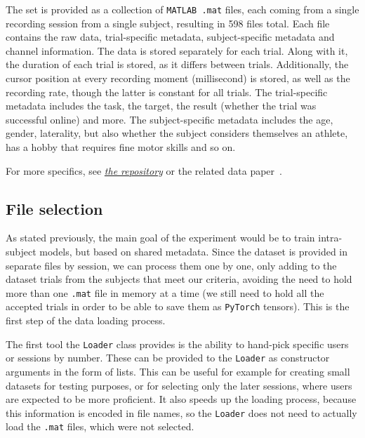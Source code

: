 \documentclass[english, he, bc, kiv, iso690alph]{fasthesis}
\begin{document}
The set is provided as a collection of \texttt{MATLAB .mat} files, each coming from a single recording session from a single subject, resulting in 598 files total. Each file contains the raw data, trial-specific metadata, subject-specific metadata and channel information.
The data is stored separately for each trial. Along with it, the duration of each trial is stored, as it differs between trials. Additionally, the cursor position at every recording moment (millisecond) is stored, as well as the recording rate, though the latter is constant for all trials.
The trial-specific metadata includes the task, the target, the result (whether the trial was successful online) and more.
The subject-specific metadata includes the age, gender, laterality, but also whether the subject considers themselves an athlete, has a hobby that requires fine motor skills and so on.

For more specifics, see \href{https://figshare.com/articles/dataset/Human_EEG_Dataset_for_Brain-Computer_Interface_and_Meditation/13123148?file=25302482}{\textit{the repository}} or the related data paper~\cite{data:stieger:21}.

\subsection{File selection}

As stated previously, the main goal of the experiment would be to train intra-subject models, but based on shared metadata. Since the dataset is provided in separate files by session, we can process them one by one, only adding to the dataset trials from the subjects that meet our criteria, avoiding the need to hold more than one \texttt{.mat} file in memory at a time (we still need to hold all the accepted trials in order to be able to save them as \texttt{PyTorch} tensors). This is the first step of the data loading process.

The first tool the \texttt{Loader} class provides is the ability to hand-pick specific users or sessions by number. These can be provided to the \texttt{Loader} as constructor arguments in the form of lists. This can be useful for example for creating small datasets for testing purposes, or for selecting only the later sessions, where users are expected to be more proficient. It also speeds up the loading process, because this information is encoded in file names, so the \texttt{Loader} does not need to actually load the \texttt{.mat} files, which were not selected.
\end{document}

